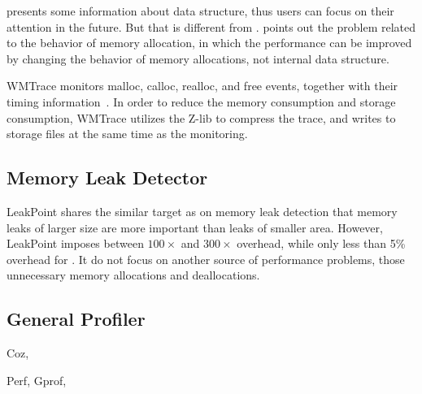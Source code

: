 \MP{} presents some information about data structure, thus users can focus on their attention in the future. But that is different from \MP{}. \MP{} points out the problem related to the behavior of memory allocation, in which the performance can be improved by changing the behavior of memory allocations, not internal data structure. 
  


\cite{846583}

\cite{1190248}



WMTrace monitors malloc, calloc, realloc, and free events, together with their timing information~\cite{Perks:2011:WAP:2186355.2186369}. In order to reduce the memory consumption and storage consumption, WMTrace utilizes the Z-lib to compress the trace, and writes to storage files at the same time as the monitoring. 
 

\subsection{Memory Leak Detector}

LeakPoint\cite{Clause:2010:LPC:1806799.1806874} shares the similar target as \MP{} on memory leak detection that memory leaks of larger size
are more important than leaks of smaller area. However, LeakPoint imposes between $100\times$ and $300\times$ overhead, while only less than 5\% overhead for \MP{}. It do not focus on another source of performance problems, those unnecessary memory allocations and deallocations. 

\subsection{General Profiler}

Coz, 

Perf, 
Gprof,

